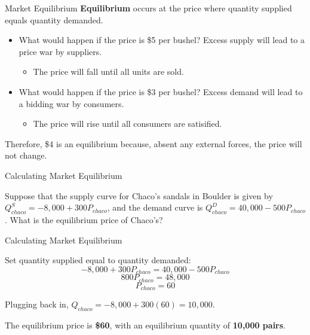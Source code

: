 \documentclass[12pt,t]{beamer}
\begin{document}
\begin{frame}{Market Equilibrium}
  \textbf{Equilibrium} occurs at the price where quantity supplied equals quantity demanded. 

  \begin{itemize}
    \item What would happen if the price is \$5 per bushel? Excess supply will lead to a price war by suppliers.
      \begin{itemize}
        \item The price will fall until all units are sold.
      \end{itemize}

    \item What would happen if the price is \$3 per bushel? Excess demand will lead to a bidding war by consumers.
      \begin{itemize}
        \item The price will rise until all consumers are satisified.
      \end{itemize}
  \end{itemize}


  Therefore, \$4 is an equilibrium because, absent any external forces, the price will not change.
\end{frame}

\begin{frame}{Calculating Market Equilibrium}

\bigskip
Suppose that the supply curve for Chaco's sandals in Boulder is given by $Q^S_{chaco} = -8,000 + 300P_{chaco}$, and the demand curve is $Q^D_{chaco} = 40,000  - 500P_{chaco}$. What is the equilibrium price of Chaco's?

\end{frame}

\begin{frame}{Calculating Market Equilibrium}

\bigskip
Set quantity supplied equal to quantity demanded:
$$
  -8,000 + 300P_{chaco} = 40,000 - 500P_{chaco}
$$
$$
  800P_{chaco} = 48,000
$$
$$
  P_{chaco} = 60
$$

\bigskip
Plugging back in, $Q_{chaco} = -8,000 + 300(60) = 10,000$.

\bigskip
The equilibrium price is \textbf{\$60}, with an equilibrium quantity of \textbf{10,000 pairs}.
\end{frame}
\end{document}

